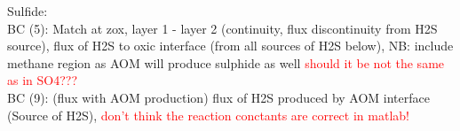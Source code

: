 \documentclass[gmd, manuscript]{copernicus}
\begin{document}
Sulfide:\\
BC (5): Match at zox, layer 1 - layer 2 (continuity, flux discontinuity from H2S source), flux of H2S to oxic interface (from all sources of H2S below), 
NB: include methane region as AOM will produce sulphide as well \textcolor{red}{should it be not the same as in SO4???}\\
BC (9): (flux with AOM production) flux of H2S produced by AOM interface (Source of H2S), \textcolor{red}{don't think the reaction conctants are correct in matlab!}


\end{document}
